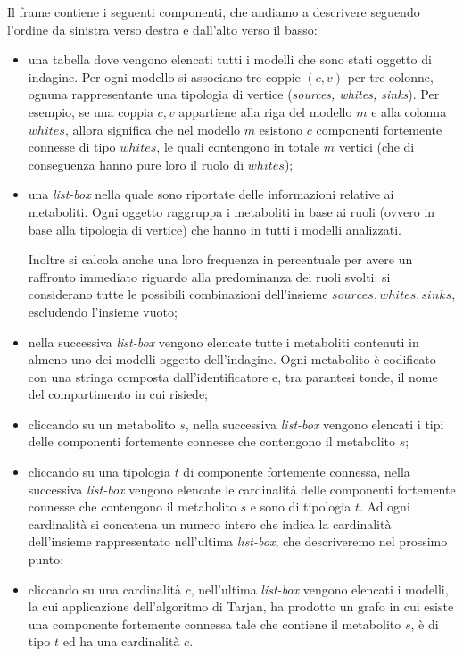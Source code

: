 Il frame contiene i seguenti componenti, che andiamo a descrivere
seguendo l'ordine da sinistra verso destra e dall'alto verso il basso:
\begin{itemize}
\item una tabella dove vengono elencati tutti i modelli che sono stati
  oggetto di indagine. Per ogni modello si associano tre coppie $(c,
  v)$ per tre colonne, ognuna rappresentante una tipologia di vertice
  (\emph{sources, whites, sinks}). Per esempio, se una coppia $c, v$
  appartiene alla riga del modello $m$ e alla colonna $whites$, allora
  significa che nel modello $m$ esistono $c$ componenti fortemente
  connesse di tipo $whites$, le quali contengono in totale $m$ vertici
  (che di conseguenza hanno pure loro il ruolo di $whites$);
\item una \emph{list-box} nella quale sono riportate delle
  informazioni relative ai metaboliti. Ogni oggetto raggruppa i
  metaboliti in base ai ruoli (ovvero in base alla tipologia di
  vertice) che hanno in tutti i modelli analizzati.

  Inoltre si calcola anche una loro frequenza in percentuale per avere
  un raffronto immediato riguardo alla predominanza dei ruoli svolti:
  si considerano tutte le possibili combinazioni dell'insieme
  ${sources, whites, sinks}$, escludendo l'insieme vuoto;
\item nella successiva \emph{list-box} vengono elencate tutte i
  metaboliti contenuti in almeno uno dei modelli oggetto
  dell'indagine. Ogni metabolito \`e codificato con una stringa
  composta dall'identificatore e, tra parantesi tonde, il nome del
  compartimento in cui risiede;
\item cliccando su un metabolito $s$, nella successiva \emph{list-box}
  vengono elencati i tipi delle componenti fortemente connesse che
  contengono il metabolito $s$;
\item cliccando su una tipologia $t$ di componente fortemente
  connessa, nella successiva \emph{list-box} vengono elencate le
  cardinalit\`a delle componenti fortemente connesse che contengono il
  metabolito $s$ e sono di tipologia $t$. Ad ogni cardinalit\`a si
  concatena un numero intero che indica la cardinalit\`a dell'insieme
  rappresentato nell'ultima \emph{list-box}, che descriveremo nel
  prossimo punto;
\item cliccando su una cardinalit\`a $c$, nell'ultima \emph{list-box}
  vengono elencati i modelli, la cui applicazione dell'algoritmo di
  Tarjan, ha prodotto un grafo in cui esiste una componente fortemente
  connessa tale che contiene il metabolito $s$, \`e di tipo $t$ ed ha
  una cardinalit\`a $c$.
\end{itemize}

